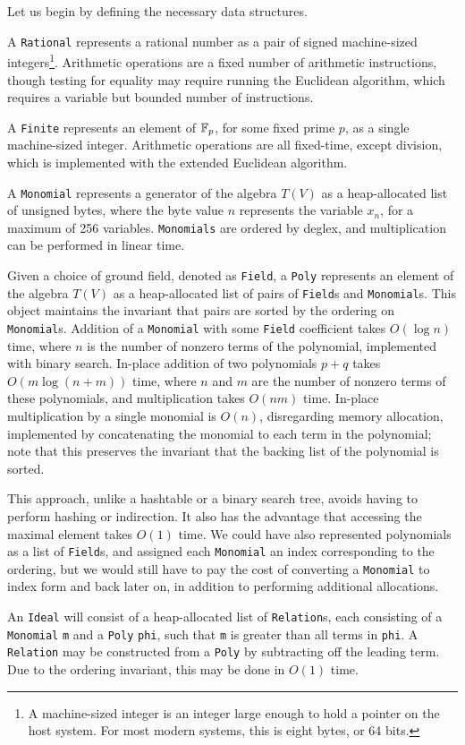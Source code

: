 Let us begin by defining the necessary data structures.

\begin{defn}
    A \verb|Rational| represents a rational number as a pair of signed machine-sized 
    integers\footnote{A machine-sized integer is an integer large enough to hold a pointer on
    the host system. For most modern systems, this is eight bytes, or 64 bits.}. Arithmetic
    operations are a fixed number of arithmetic instructions, though testing for equality
    may require running the Euclidean algorithm, which requires a variable but bounded number 
    of instructions.
    
    A \verb|Finite| represents an element of $\mathbb{F}_p$, for some fixed prime $p$, as a
    single machine-sized integer. Arithmetic operations are all fixed-time, except division,
    which is implemented with the extended Euclidean algorithm.
    
    A \verb|Monomial| represents a generator of the algebra $T(V)$ as a heap-allocated
    list of unsigned bytes, where the byte value $n$ represents the variable $x_n$,
    for a maximum of 256 variables. \verb|Monomials| are ordered by deglex,
    and multiplication can be performed in linear time.

    Given a choice of ground field, denoted as \verb|Field|, 
    a \verb|Poly| represents an element of the algebra $T(V)$ as a heap-allocated
    list of pairs of \verb|Field|s and \verb|Monomial|s. This object maintains the
    invariant that pairs are sorted by the ordering on \verb|Monomial|s. Addition
    of a \verb|Monomial| with some \verb|Field| coefficient takes $O(\log n)$ time,
    where $n$ is the number of nonzero terms of the polynomial, implemented with binary
    search. In-place addition of two polynomials $p + q$ takes $O(m\log (n+m))$ time, 
    where $n$ and $m$ are the number of nonzero terms of these polynomials, and
    multiplication takes $O(nm)$ time. In-place multiplication by a single monomial
    is $O(n)$, disregarding memory allocation, implemented by concatenating the monomial
    to each term in the polynomial; note that this preserves the invariant that the backing
    list of the polynomial is sorted.
    
    This approach, unlike a hashtable or a binary
    search tree, avoids having to perform hashing or indirection. It also has the
    advantage that accessing the maximal element takes $O(1)$ time. We could have
    also represented polynomials as a list of \verb|Field|s, and assigned each
    \verb|Monomial| an index corresponding to the ordering, but we would still have to pay
    the cost of converting a \verb|Monomial| to index form and back later on, in addition
    to performing additional allocations.
    
    An \verb|Ideal| will consist of a heap-allocated list of \verb|Relation|s,
    each consisting of a \verb|Monomial| \verb|m| and a \verb|Poly| \verb|phi|, 
    such that \verb|m| is greater than all terms in \verb|phi|. A \verb|Relation|
    may be constructed from a \verb|Poly| by subtracting off the leading term. Due
    to the ordering invariant, this may be done in $O(1)$ time.
\end{defn}

